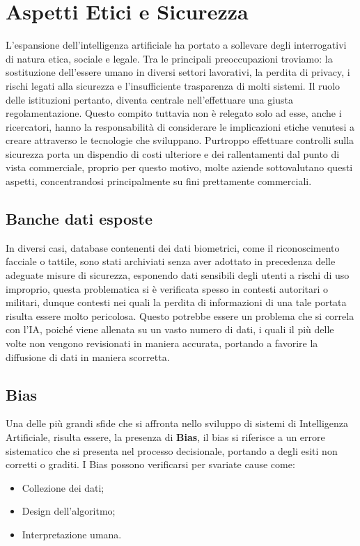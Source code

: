 \section{Aspetti Etici e Sicurezza}

L'espansione dell'intelligenza artificiale ha portato a sollevare degli interrogativi di natura etica, sociale e legale. Tra le principali preoccupazioni troviamo: la sostituzione dell’essere umano in diversi settori lavorativi, la perdita di privacy, i rischi legati alla sicurezza e l’insufficiente trasparenza di molti sistemi. Il ruolo delle istituzioni pertanto, diventa centrale nell'effettuare una giusta regolamentazione. Questo compito tuttavia non è relegato solo ad esse, anche i ricercatori, hanno la responsabilità di considerare le implicazioni etiche venutesi a creare attraverso le tecnologie che sviluppano. Purtroppo effettuare controlli sulla sicurezza porta un dispendio di costi ulteriore e dei rallentamenti dal punto di vista commerciale, proprio per questo motivo, molte aziende sottovalutano questi aspetti, concentrandosi principalmente su fini prettamente commerciali.

\subsection{Banche dati esposte}

In diversi casi, database contenenti dei dati biometrici, come il riconoscimento facciale o tattile, sono stati archiviati senza aver adottato in precedenza delle adeguate misure di sicurezza, esponendo dati sensibili degli utenti a rischi di uso improprio, questa problematica si è verificata spesso in contesti autoritari o militari, dunque contesti nei quali la perdita di informazioni di una tale portata risulta essere molto pericolosa. Questo potrebbe essere un problema che si correla con l'IA, poiché viene allenata su un vasto numero di dati, i quali il più delle volte non vengono revisionati in maniera accurata, portando a favorire la diffusione di dati in maniera scorretta.

\subsection{Bias}

Una delle più grandi sfide che si affronta nello sviluppo di sistemi di Intelligenza Artificiale, risulta essere, la presenza di \textbf{Bias}, il bias si riferisce a un errore sistematico che si presenta nel processo decisionale, portando a degli esiti non corretti o graditi. I Bias possono verificarsi per svariate cause come:
\begin{itemize}
    \item Collezione dei dati;
    \item Design dell'algoritmo;
    \item Interpretazione umana.
\end{itemize}


